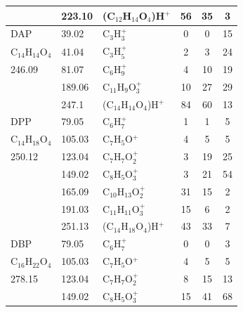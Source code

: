 {{\begin{longtable}[c]{lllccc}
          & 223.10                & (C$_{12}$H$_{14}$O$_4$)H$^+$ & 56           & 35           & 3            \\
\hline
DAP                                                      & 39.02  & C$_3$H$_3^+$                        & 0  & 0  & 15 \\
C$_{14}$H$_{14}$O$_4$ & 41.04  & C$_3$H$_5^+$                        & 2  & 3  & 24 \\
246.09                                                   & 81.07  & C$_6$H$_9^+$                        & 4  & 10 & 19 \\
                                                         & 189.06 & C$_{11}$H$_9$O$_3^+$     & 10 & 27 & 29 \\
                                                         & 247.1  & (C$_{14}$H$_{14}$O$_4$)H$^+$ & 84 & 60 & 13\\
\hline
DPP       & 79.05                & C$_6$H$_7^+$                           & 1            & 1            & 5            \\
C$_{14}$H$_{18}$O$_4$          & 105.03               & C$_7$H$_5$O$^+$                          & 4            & 5            & 5            \\
250.12          & 123.04               & C$_7$H$_7$O$_2^+$      & 3            & 19           & 25           \\
          & 149.02               & C$_8$H$_5$O$_3^+$      & 3            & 21           & 54           \\
          & 165.09               & C$_{10}$H$_{13}$O$_2^+$    & 31           & 15           & 2            \\
          & 191.03               & C$_{11}$H$_{11}$O$_3^+$    & 15           & 6            & 2            \\
          & 251.13               & (C$_{14}$H$_{18}$O$_4$)H$^+$ & 43           & 33           & 7            \\
\hline
DBP                                                      & 79.05  & C$_6$H$_7^+$                        & 0  & 0  & 3  \\
C$_{16}$H$_{22}$O$_4$ & 105.03 & C$_7$H$_5$O$^+$                       & 4  & 5  & 5  \\
278.15                                                   & 123.04 & C$_7$H$_7$O$_2^+$      & 8  & 15 & 13 \\
                                                         & 149.02 & C$_8$H$_5$O$_3^+$      & 15 & 41 & 68 \\

\end{longtable}}}
